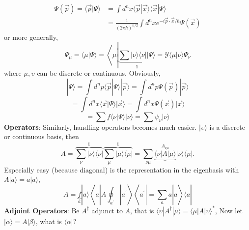 \begin{equation}
\begin{aligned} \Psi(\vec{p})=\langle\vec{p} | \Psi\rangle &=\int d^{n} x\langle\vec{p} | \vec{x}\rangle\langle\vec{x} | \Psi\rangle \\ &=\frac{1}{(2 \pi \hbar)^{n / 2}} \int d^{n} x e^{-i \vec{p} \cdot \vec{x} / \hbar} \Psi(\vec{x}) \end{aligned}
\end{equation}
or more generally,
\begin{equation}
    \Psi_{\mu}=\langle\mu | \Psi\rangle=\left\langle\mu\left|\underbrace{\sum|\nu\rangle\langle\nu|| \Psi\rangle}_{\mathbb{1}}=\mathcal{Y}\langle\mu | \nu\rangle \Psi_{\nu}\right.\right.
    \end{equation}
where $\mu,\upsilon$ can be discrete or continuous. Obviously,
\begin{equation}
    |\Psi\rangle=\int d^{n} p\langle\vec{p} | \Psi\rangle|\vec{p}\rangle=\int d^{n} p \Psi(\vec{p})|\vec{p}\rangle
\end{equation}
\begin{equation}
    =\int d^{n} x\langle\vec{x} | \Psi\rangle|\vec{x}\rangle=\int d^{n} x \Psi(\vec{x})|\vec{x}\rangle
\end{equation}
\begin{equation}
    =\sum f\langle\nu | \Psi\rangle|\nu\rangle=\sum \psi_{\nu}|\nu\rangle
    \end{equation}
\textbf{Operators}: Similarly, handling operators becomes much easier. $|\upsilon\rangle$ is a discrete or continuous basis, then
\begin{equation}
    A=\overbrace{\sum_{\nu}|\nu\rangle\langle\nu|}^{\mathbb{1}} \overbrace{\sum_{\mu}|\mu\rangle\langle\mu|}^{\mathbb{1}}=\sum_{\nu\mu}\underbrace{\langle\nu|A| \mu\rangle}^{A_{\nu\mu}} |\nu\rangle\langle\mu|.
    \end{equation}
Especially easy (because diagonal) is the representation in the eigenbasis with $A| a\rangle=a| a\rangle$,
\begin{equation}
    A=\underbrace{f}_{a}|a\rangle\left\langle a\left|A \oint_{a^{\prime}}\right| a^{\prime}\right\rangle\left\langle a^{\prime}\left|=\sum_{a} a\right| a\right\rangle\langle a|
    \end{equation}
\textbf{Adjoint Operators}: Be $A^{\dagger}$
adjunct to $A$, that is $\langle \upsilon| A^{\dagger}|\mu\rangle=\langle\mu| A|\upsilon\rangle^*$, Now let $|\alpha\rangle=A|\beta\rangle$, what is $\langle\alpha|$?
